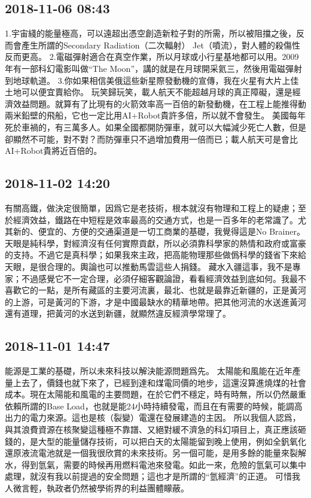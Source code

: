\documentclass[twocolumn]{ctexart}
\begin{document}
\subsection*{2018-11-06 08:43}

1.宇宙綫的能量極高，可以遠超出憑空創造新粒子對的所需，所以被阻擋之後，反而會產生所謂的Secondary Radiation（二次輻射） Jet（噴流），對人體的殺傷性反而更高。 
2.電磁彈射適合在真空作業，所以月球或小行星基地都可以用。2009年有一部科幻電影叫做“The Moon”，講的就是在月球開采氦三，然後用電磁彈射到地球軌道。 
3.你如果相信美俄這些新星際發動機的宣傳，我在火星有大片上佳土地可以便宜賣給你。 
玩笑歸玩笑，載人航天不能超越月球的真正障礙，還是經濟效益問題。就算有了比現有的火箭效率高一百倍的新發動機，在工程上能推得動兩米鉛壁的飛船，它也一定比用AI+Robot貴許多倍，所以就不會發生。 
美國每年死於車禍的，有三萬多人。如果全國都開防彈車，就可以大幅減少死亡人數，但是卻顯然不可能，對不對？而防彈車只不過增加費用一倍而已；載人航天可是會比AI+Robot貴將近百倍的。
\subsection*{2018-11-02 14:20}

有關高鐵，做決定很簡單，因爲它是老技術，根本就沒有物理和工程上的疑慮；至於經濟效益，鐵路在中短程是效率最高的交通方式，也是一百多年的老常識了。尤其新的、便宜的、方便的交通渠道是一切工商業的基礎，我覺得這是No Brainer。
天眼是純科學，對經濟沒有任何實際貢獻，所以必須靠科學家的熱情和政府或富豪的支持。不過它是真科學；如果我來主政，把高能物理那些做僞科學的錢省下來給天眼，是很合理的。輿論也可以推動馬雲這些人捐錢。
藏水入疆這事，我不是專家；不過感覺它不一定合理，必須仔細客觀論證，看看經濟效益到底如何。我最不喜歡它的一點，是所有藏區的主要河流裏，最北、也就是最靠近新疆的，正是黃河的上游，可是黃河的下游，才是中國最缺水的精華地帶。把其他河流的水送進黃河還有道理，把黃河的水送到新疆，就顯然違反經濟學常理了。
\subsection*{2018-11-01 14:47}

能源是工業的基礎，所以未來科技以解決能源問題爲先。
太陽能和風能在近年產量上去了，價錢也就下來了，已經到達和煤電同價的地步，這還沒算進燒煤的社會成本。現在太陽能和風電的主要問題，在於它們不穩定，時有時無，所以仍然嚴重依賴所謂的Base Load，也就是能24小時持續發電，而且在有需要的時候，能調高出力的電力來源。這也是核（裂變）電還在發展建造的主因。
所以我個人認爲，與其浪費資源在核聚變這種極不靠譜、又絕對緩不濟急的科幻項目上，真正應該砸錢的，是大型的能量儲存技術，可以把白天的太陽能留到晚上使用，例如全釩氧化還原液流電池就是一個我很欣賞的未來技術。另一個可能，是用多餘的能量來裂解水，得到氫氣，需要的時候再用燃料電池來發電。如此一來，危險的氫氣可以集中處理，就沒有我以前提過的安全問題；這也才是所謂的“氫經濟”的正道。
可惜我人微言輕，執政者仍然被學術界的利益團體矇蔽。
\end{document}
